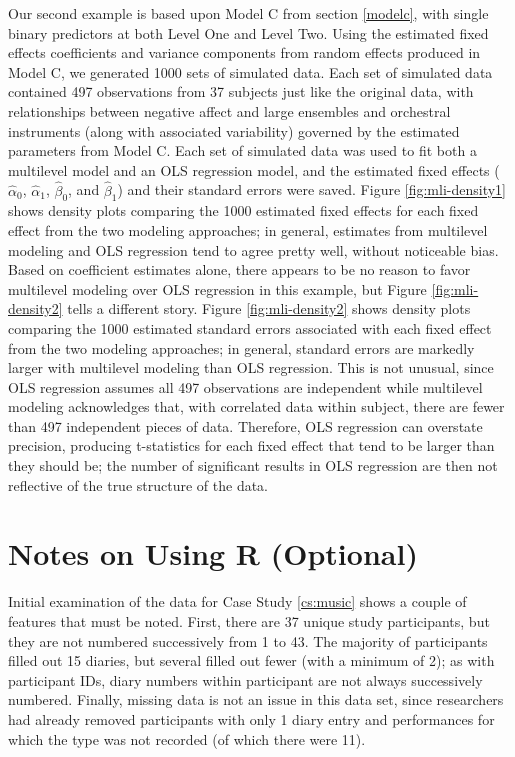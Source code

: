 \documentclass[
]{krantz}
\begin{document}
Our second example is based upon Model C from section \ref{modelc}, with single binary predictors at both Level One and Level Two. Using the estimated fixed effects coefficients and variance components from random effects produced in Model C, we generated 1000 sets of simulated data. Each set of simulated data contained 497 observations from 37 subjects just like the original data, with relationships between negative affect and large ensembles and orchestral instruments (along with associated variability) governed by the estimated parameters from Model C. Each set of simulated data was used to fit both a multilevel model and an OLS regression model, and the estimated fixed effects (\(\hat{\alpha}_{0}\), \(\hat{\alpha}_{1}\), \(\hat{\beta}_{0}\), and \(\hat{\beta}_{1}\)) and their standard errors were saved. Figure \ref{fig:mli-density1} shows density plots comparing the 1000 estimated fixed effects for each fixed effect from the two modeling approaches; in general, estimates from multilevel modeling and OLS regression tend to agree pretty well, without noticeable bias. Based on coefficient estimates alone, there appears to be no reason to favor multilevel modeling over OLS regression in this example, but Figure \ref{fig:mli-density2} tells a different story. Figure \ref{fig:mli-density2} shows density plots comparing the 1000 estimated standard errors associated with each fixed effect from the two modeling approaches; in general, standard errors are markedly larger with multilevel modeling than OLS regression. This is not unusual, since OLS regression assumes all 497 observations are independent while multilevel modeling acknowledges that, with correlated data within subject, there are fewer than 497 independent pieces of data. Therefore, OLS regression can overstate precision, producing t-statistics for each fixed effect that tend to be larger than they should be; the number of significant results in OLS regression are then not reflective of the true structure of the data.

\hypertarget{notesr8}{%
\section{Notes on Using R (Optional)}\label{notesr8}}

Initial examination of the data for Case Study \ref{cs:music} shows a couple of features that must be noted. First, there are 37 unique study participants, but they are not numbered successively from 1 to 43. The majority of participants filled out 15 diaries, but several filled out fewer (with a minimum of 2); as with participant IDs, diary numbers within participant are not always successively numbered. Finally, missing data is not an issue in this data set, since researchers had already removed participants with only 1 diary entry and performances for which the type was not recorded (of which there were 11).
\end{document}
